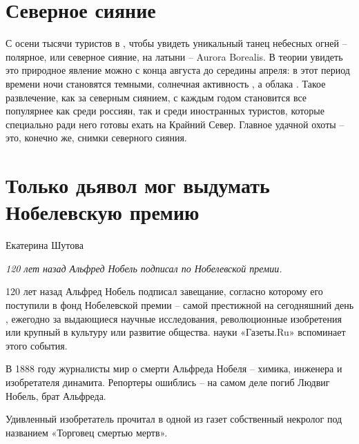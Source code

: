 \section{Северное сияние}
С  осени тысячи туристов  в , чтобы увидеть уникальный танец небесных огней -- полярное, или северное сияние, на латыни -- Aurora Borealis.
В теории увидеть это природное явление можно с конца августа до середины апреля: в этот период времени ночи становятся темными, солнечная активность , а облака .
Такое развлечение, как  за северным сиянием, с каждым годом становится все популярнее как среди россиян, так и среди иностранных туристов, которые специально ради него готовы ехать на Крайний Север. Главное  удачной охоты -- это, конечно же, снимки северного сияния.

\clearpage
\section{Только дьявол мог выдумать Нобелевскую премию}
Екатерина Шутова

\textit{120 лет назад Альфред Нобель подписал  по Нобелевской премии.}

120 лет назад Альфред Нобель подписал завещание, согласно которому его  поступили в фонд Нобелевской премии -- самой престижной на сегодняшний день , ежегодно  за выдающиеся научные исследования, революционные изобретения или крупный  в культуру или развитие общества.  науки «Газеты.Ru» вспоминает  этого события.

В 1888 году журналисты  мир о смерти Альфреда Нобеля -- химика, инженера и изобретателя динамита. Репортеры ошиблись -- на самом деле погиб Людвиг Нобель, брат Альфреда.

\begin{fancyquotes}
    Удивленный изобретатель прочитал в одной из газет собственный некролог под названием «Торговец смертью мертв».
\end{fancyquotes}

